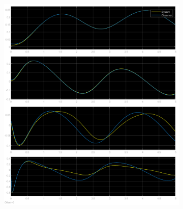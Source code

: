 \documentclass[class=article, crop=false]{standalone}
\begin{document}
\begin{resolution}
\begin{figure}[H]
\begin{subfigure}[b]{0.475\textwidth}
            \includegraphics[width=\textwidth]{../images/simulink_scope5_02_01_02.png}
            \caption{}
        \end{subfigure}
        \caption{}
    \end{figure}
\end{resolution}
\end{document}
